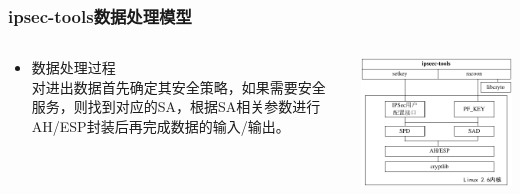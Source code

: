 \documentclass[xcolor=svgnames,presentation]{beamer}
\begin{document}
\begin{frame}
\frametitle{ipsec-tools数据处理模型}
\label{sec-4-9}
\begin{columns}
\begin{column}{0.4\textwidth}
\begin{itemize}

\item 数据处理过程\\
\label{sec-4-9-1}%
对进出数据首先确定其安全策略，如果需要安全服务，则找到对应的SA，根据SA相关参数进行AH/ESP封装后再完成数据的输入/输出。
\end{itemize} %
\end{column}
\begin{column}{0.6\textwidth}
\label{sec-4-9-2}

\includegraphics[width=.9\linewidth]{img/ipsec-tools.png}
\end{column}
\end{columns}
\end{frame}
\end{document}
